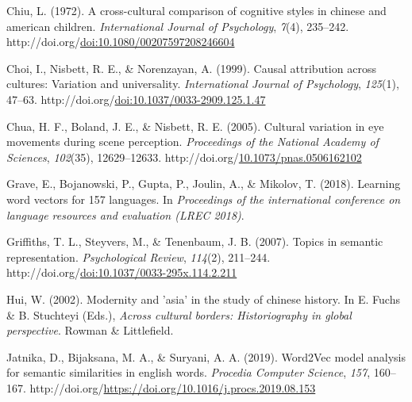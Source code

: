 \documentclass[10pt, letterpaper]{article}
\newenvironment{CSLReferences}%
  {}%
  {\par}
\begin{document}
\noindent

\newpage

\hypertarget{refs}{}
\begin{CSLReferences}{1}{0}
\leavevmode{}%
Chiu, L. (1972). A cross-cultural comparison of cognitive styles in
chinese and american children. \emph{International Journal of
Psychology}, \emph{7}(4), 235--242.
http://doi.org/\href{https://doi.org/doi:10.1080/00207597208246604}{doi:10.1080/00207597208246604}

\leavevmode{}%
Choi, I., Nisbett, R. E., \& Norenzayan, A. (1999). Causal attribution
across cultures: Variation and universality. \emph{International Journal
of Psychology}, \emph{125}(1), 47--63.
http://doi.org/\href{https://doi.org/doi:10.1037/0033-2909.125.1.47}{doi:10.1037/0033-2909.125.1.47}

\leavevmode{}%
Chua, H. F., Boland, J. E., \& Nisbett, R. E. (2005). Cultural variation
in eye movements during scene perception. \emph{Proceedings of the
National Academy of Sciences}, \emph{102}(35), 12629--12633.
http://doi.org/\href{https://doi.org/10.1073/pnas.0506162102}{10.1073/pnas.0506162102}

\leavevmode{}%
Grave, E., Bojanowski, P., Gupta, P., Joulin, A., \& Mikolov, T. (2018).
Learning word vectors for 157 languages. In \emph{Proceedings of the
international conference on language resources and evaluation (LREC
2018)}.

\leavevmode{}%
Griffiths, T. L., Steyvers, M., \& Tenenbaum, J. B. (2007). Topics in
semantic representation. \emph{Psychological Review}, \emph{114}(2),
211--244.
http://doi.org/\href{https://doi.org/doi:10.1037/0033-295x.114.2.211}{doi:10.1037/0033-295x.114.2.211}

\leavevmode{}%
Hui, W. (2002). Modernity and 'asia' in the study of chinese history. In
E. Fuchs \& B. Stuchteyi (Eds.), \emph{Across cultural borders:
Historiography in global perspective}. Rowman \& Littlefield.

\leavevmode{}%
Jatnika, D., Bijaksana, M. A., \& Suryani, A. A. (2019). Word2Vec model
analysis for semantic similarities in english words. \emph{Procedia
Computer Science}, \emph{157}, 160--167.
http://doi.org/\url{https://doi.org/10.1016/j.procs.2019.08.153}


\end{CSLReferences}
\end{document}

